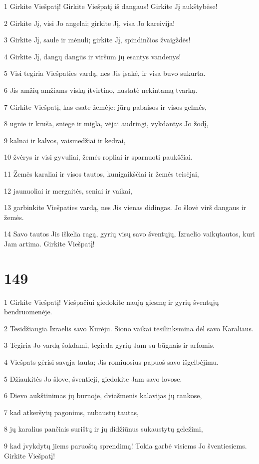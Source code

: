 \par 1 Girkite Viešpatį! Girkite Viešpatį iš dangaus! Girkite Jį aukštybėse! 
\par 2 Girkite Jį, visi Jo angelai; girkite Jį, visa Jo kareivija! 
\par 3 Girkite Jį, saule ir mėnuli; girkite Jį, spindinčios žvaigždės! 
\par 4 Girkite Jį, dangų dangūs ir viršum jų esantys vandenys! 
\par 5 Visi tegiria Viešpaties vardą, nes Jis įsakė, ir visa buvo sukurta. 
\par 6 Jis amžių amžiams viską įtvirtino, nustatė nekintamą tvarką. 
\par 7 Girkite Viešpatį, kas esate žemėje: jūrų pabaisos ir visos gelmės, 
\par 8 ugnie ir kruša, sniege ir migla, vėjai audringi, vykdantys Jo žodį, 
\par 9 kalnai ir kalvos, vaismedžiai ir kedrai, 
\par 10 žvėrys ir visi gyvuliai, žemės ropliai ir sparnuoti paukščiai. 
\par 11 Žemės karaliai ir visos tautos, kunigaikščiai ir žemės teisėjai, 
\par 12 jaunuoliai ir mergaitės, seniai ir vaikai, 
\par 13 garbinkite Viešpaties vardą, nes Jis vienas didingas. Jo šlovė virš dangaus ir žemės. 
\par 14 Savo tautos Jis iškelia ragą, gyrių visų savo šventųjų, Izraelio vaikų­tautos, kuri Jam artima. Girkite Viešpatį!


\chapter{149}


\par 1 Girkite Viešpatį! Viešpačiui giedokite naują giesmę ir gyrių šventųjų bendruomenėje. 
\par 2 Tesidžiaugia Izraelis savo Kūrėju. Siono vaikai tesilinksmina dėl savo Karaliaus. 
\par 3 Tegiria Jo vardą šokdami, tegieda gyrių Jam su būgnais ir arfomis. 
\par 4 Viešpats gėrisi savąja tauta; Jis romiuosius papuoš savo išgelbėjimu. 
\par 5 Džiaukitės Jo šlove, šventieji, giedokite Jam savo lovose. 
\par 6 Dievo aukštinimas jų burnoje, dviašmenis kalavijas jų rankose, 
\par 7 kad atkeršytų pagonims, nubaustų tautas, 
\par 8 jų karalius pančiais surištų ir jų didžiūnus sukaustytų geležimi, 
\par 9 kad įvykdytų jiems paruoštą sprendimą! Tokia garbė visiems Jo šventiesiems. Girkite Viešpatį!


